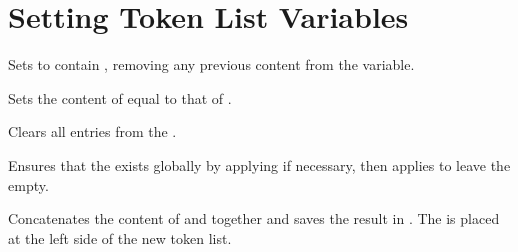 \documentclass[oneside]{book}
\begin{document}
\section{Setting Token List Variables}

\begin{function}{\tlSet}
\begin{syntax}
  
\end{syntax}
Sets  to contain ,
removing any previous content from the variable.
\begin{demohigh}
\tlSet {}
\tlUse \lTmpiTl
\end{demohigh}
\end{function}

\begin{function}{\tlSetEq}
\begin{syntax}
  
\end{syntax}
Sets the content of  equal to that of .
\begin{demohigh}
\tlSet {}
\tlSetEq \lTmpbTl \lTmpaTl
\tlUse \lTmpbTl
\end{demohigh}
\end{function}

\begin{function}{\tlClear}
\begin{syntax}
 
\end{syntax}
Clears all entries from the .
\begin{demohigh}
\tlSet {}
\tlClear \lTmpjTl
\tlSet {}
\tlUse \lTmpjTl
\end{demohigh}
\end{function}

\begin{function}{\tlClearNew}
\begin{syntax}
 
\end{syntax}
Ensures that the  exists globally by applying
 if necessary, then applies  to leave
the  empty.
\begin{codehigh}
\tlClearNew \lFooSomeTl
\end{codehigh}
\end{function}

\begin{function}{\tlConcat}
\begin{syntax}
   
\end{syntax}
Concatenates the content of  and 
together and saves the result in . The 
is placed at the left side of the new token list.
\begin{demohigh}
\tlSet {}
\tlSet {}
\tlConcat \lTmpaTl \lTmpbTl \lTmpcTl
\tlUse \lTmpaTl
\end{demohigh}
\end{function}
\end{document}
